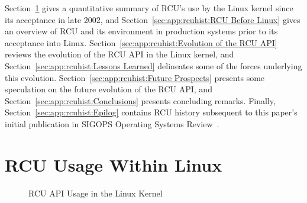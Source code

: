Section~\ref{sec:app:rcuhist:RCU Usage Within Linux}
gives a quantitative summary of RCU's use by the Linux kernel since
its acceptance in late 2002,
and Section~\ref{sec:app:rcuhist:RCU Before Linux} gives an overview of RCU and
its environment in production systems prior to its acceptance into Linux.
Section~\ref{sec:app:rcuhist:Evolution of the RCU API}
reviews the evolution of the RCU API in the Linux kernel, and
Section~\ref{sec:app:rcuhist:Lessons Learned}
delineates some of the forces underlying this evolution.
Section~\ref{sec:app:rcuhist:Future Prospects}
presents some speculation on the future evolution of the RCU API,
and
Section~\ref{sec:app:rcuhist:Conclusions}
presents concluding remarks.
Finally, Section~\ref{sec:app:rcuhist:Epilog} contains RCU history subsequent to
this paper's initial publication in
SIGOPS Operating Systems Review~\cite{PaulEMcKenney2008RCUOSR}.

\section{RCU Usage Within Linux}
\label{sec:app:rcuhist:RCU Usage Within Linux}

\begin{figure}[tb]
\begin{center}
\end{center}
\caption{RCU API Usage in the Linux Kernel}
\label{fig:app:rcuhist:RCU API Usage in the Linux Kernel}
\end{figure}

